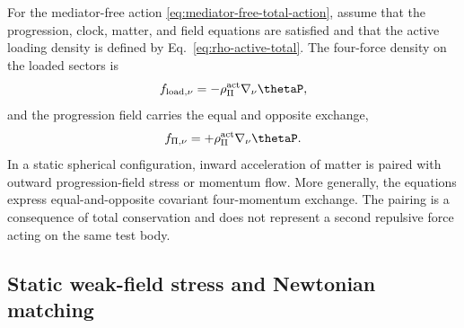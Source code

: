 \documentclass[12pt]{article}
\begin{document}
\begin{theorem}
For the mediator-free action \eqref{eq:mediator-free-total-action}, assume that the progression, clock, matter, and field equations are satisfied and that the active loading density is defined by Eq.~\eqref{eq:rho-active-total}.  The four-force density on the loaded sectors is
\begin{equation}
    f_{{\rm load},\nu}
    =-\rho_\Pi^{\rm act}\nabla_\nu\thetaP,
    \label{eq:loaded-force-density}
\end{equation}
and the progression field carries the equal and opposite exchange,
\begin{equation}
    f_{\Pi,\nu}
    =+\rho_\Pi^{\rm act}\nabla_\nu\thetaP.
    \label{eq:progression-force-density}
\end{equation}
In a static spherical configuration, inward acceleration of matter is paired with outward progression-field stress or momentum flow.  More generally, the equations express equal-and-opposite covariant four-momentum exchange.  The pairing is a consequence of total conservation and does not represent a second repulsive force acting on the same test body.
\end{theorem}

\subsection{Static weak-field stress and Newtonian matching}
\end{document}
